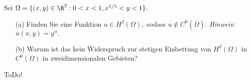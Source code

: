 
\begin{exercise}

  Sei $\Omega = \{(x, y) \in \R^2: 0 < x < 1, x^{1/5} < y < 1\}.$
  \begin{itemize}
      \item[(a)] Finden Sie eine Funktion $u \in H^2(\Omega),$ sodass $u \not\in C^0(\overline{\Omega}).$ \textit{Hinweis:} $u(x, y) = y^\alpha.$
      \item[(b)] Warum ist das kein Widerspruch zur stetigen Einbettung von $H^2(\Omega)$ in $C^0(\Omega)$ in zweidimensionalen Gebieten?
  \end{itemize}

\end{exercise}


\begin{solution}

ToDo!

\end{solution}

